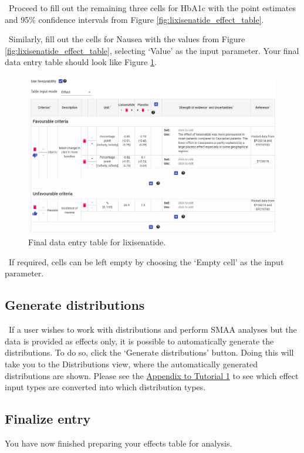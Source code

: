 \documentclass[00_mcda_tutorial.tex]{subfiles}
\begin{document}
\noindent \leftpointright \, Proceed to fill out the remaining three cells for HbA1c with the point estimates and 95\% confidence intervals from Figure \ref{fig:lixisenatide_effect_table}.
\newline

\noindent \leftpointright \, Similarly, fill out the cells for Nausea with the values from Figure \ref{fig:lixisenatide_effect_table}, selecting ‘Value’ as the input parameter. Your final data entry table should look like Figure \ref{fig:dataFinished}.

\begin{figure}[!ht]
    \centering
    \includegraphics[width=\textwidth]{fig/effectsInputDone.png}
    \caption{Final data entry table for lixisenatide.}
    \label{fig:dataFinished}
\end{figure}

\noindent \faLightbulbO \, If required, cells can be left empty by choosing the ‘Empty cell’ as the input parameter.

\subsection*{Generate distributions}
\noindent \leftpointright \, If a user wishes to work with distributions and perform SMAA analyses but the data is provided as effects only, it is possible to automatically generate the distributions. To do so, click the ‘Generate distributions’ button. Doing this will take you to the Distributions view, where the automatically generated distributions are shown. Please see the \hyperref[appendix1]{Appendix to Tutorial 1} to see which effect input types are converted into which distribution types.

\subsection*{Finalize entry}
You have now finished preparing your effects table for analysis.
\newline
\end{document}
